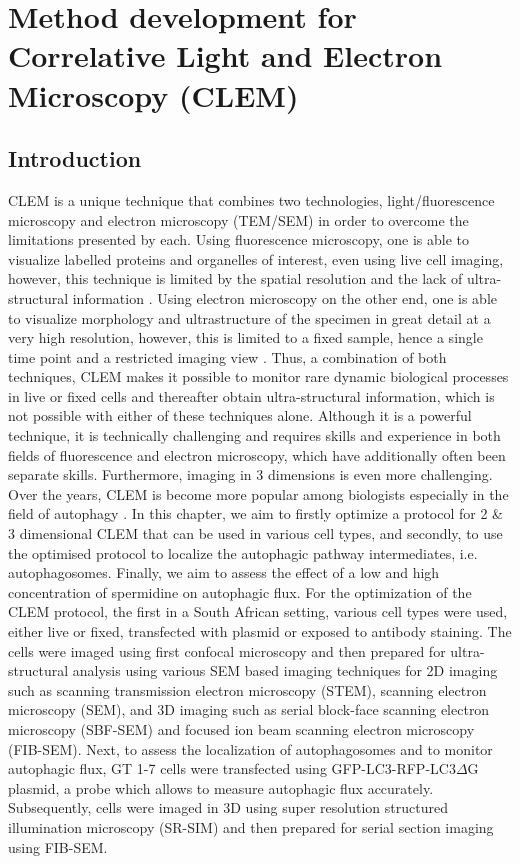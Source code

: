 \chapter{Method development for Correlative Light and Electron Microscopy (CLEM)}
\section{Introduction}
CLEM is a unique technique that combines two technologies, light/fluorescence microscopy and electron microscopy (TEM/SEM) in order to overcome the limitations presented by each. Using fluorescence microscopy, one is able to visualize labelled proteins and organelles of interest, even using live cell imaging, however, this technique is limited by the spatial resolution and the lack of ultra-structural information \citep{Russell2017}. Using electron microscopy on the other end, one is able to visualize morphology and ultrastructure of the specimen in great detail at a very high resolution, however, this is limited to a fixed sample, hence a single time point and a restricted imaging view \citep{Liss2016,Russell2017}. Thus, a combination of both techniques, CLEM makes it possible to monitor rare dynamic biological processes in live or fixed cells and thereafter obtain ultra-structural information, which is not possible with either of these techniques alone. Although it is a powerful technique, it is technically challenging and requires skills and experience in both fields of fluorescence and electron microscopy, which have additionally often been separate skills. Furthermore, imaging in 3 dimensions is even more challenging. Over the years, CLEM is become more popular among biologists especially in the field of autophagy \citep{Duke2014,Hosseini2014, Russell2017,Gudmundsson2019}. In this chapter, we aim to firstly optimize a protocol for 2 \& 3 dimensional CLEM that can be used in various cell types, and secondly, to use the optimised protocol to localize the autophagic pathway intermediates, i.e. autophagosomes. Finally, we aim to assess the effect of a low and high concentration of spermidine on autophagic flux. For the optimization of the CLEM protocol, the first in a South African setting, various cell types were used, either live or fixed, transfected with plasmid or exposed to antibody staining. The cells were imaged using first confocal microscopy and then prepared for ultra-structural analysis using various SEM based imaging techniques for 2D imaging such as scanning transmission electron microscopy (STEM), scanning electron microscopy (SEM), and 3D imaging such as serial block-face scanning electron microscopy (SBF-SEM) and focused ion beam scanning electron microscopy (FIB-SEM). Next, to assess the localization of autophagosomes and to monitor autophagic flux, GT 1-7 cells were transfected using GFP-LC3-RFP-LC3$\Delta$G plasmid, a probe which allows to measure autophagic flux accurately. Subsequently, cells were imaged in 3D using super resolution structured illumination microscopy (SR-SIM) and then prepared for serial section imaging using FIB-SEM. 


